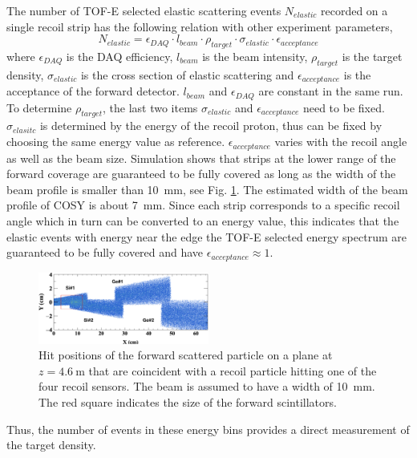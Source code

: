 \documentclass[fleqn,twocolumn,a4paper]{ikpar}
\begin{document}
\par
\medskip

The number of TOF-E selected elastic scattering events $N_{elastic}$ recorded on a single recoil strip has the
following relation with other experiment parameters,
\begin{equation}
  N_{elastic} = \epsilon_{DAQ}\cdot l_{beam}\cdot\rho_{target}\cdot\sigma_{elastic}\cdot\epsilon_{acceptance}
\end{equation}
where $\epsilon_{DAQ}$ is the DAQ efficiency, $l_{beam}$ is the beam intensity, $\rho_{target}$ is the target density,
$\sigma_{elastic}$ is the cross section of elastic scattering and
$\epsilon_{acceptance}$ is the acceptance of the forward detector.
$l_{beam}$ and $\epsilon_{DAQ}$ are constant in the same run.
To determine $\rho_{target}$, the last two items $\sigma_{elastic}$ and
$\epsilon_{acceptance}$ need to be fixed.
$\sigma_{elasitc}$ is determined by the energy of the recoil proton, thus can be
fixed by choosing the same energy value as reference.
$\epsilon_{acceptance}$ varies with the recoil angle as well as the beam size.
Simulation shows that strips at the lower range of the forward coverage are
guaranteed to be fully covered as long as the width of the beam profile is
smaller than \SI{10}{\mm}, see Fig. \ref{fig:fwd_acceptance}.
The estimated width of the beam profile of COSY is about \SI{7}{\mm}.
Since each strip corresponds to a specific recoil angle which in turn
can be converted to an energy value, this indicates that the elastic events with
energy near the edge the TOF-E selected energy spectrum are guaranteed to be
fully covered and have $\epsilon_{acceptance} \approx 1$.
\begin{figure}[t!]
  \centering
	\includegraphics[width=0.5\textwidth]{./fwd_acceptance.png}
  \caption{
    Hit positions of the forward scattered particle on a plane at
    $z=\SI{4.6}{\m}$ that are coincident with a recoil particle hitting one of
    the four recoil sensors. The beam is assumed to have a width of \SI{10}{\mm}.
     The red square indicates the size of the forward scintillators.}
  \label{fig:fwd_acceptance}
\end{figure}
Thus, the number of events in these energy bins provides a direct measurement of the target density.
\end{document}
